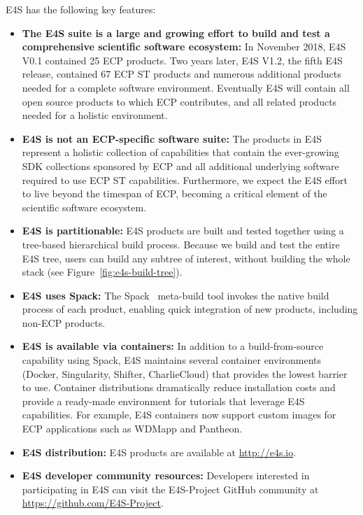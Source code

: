 E4S has the following key features:
\begin{itemize}
	\item \textbf{The E4S suite is a large and growing effort to build and test a comprehensive scientific software ecosystem:} In November 2018, E4S V0.1 contained 25 ECP products.  Two years later, E4S V1.2, the fifth E4S release, contained 67 ECP ST products and numerous additional products needed for a complete software environment.  Eventually E4S will contain all open source products to which ECP contributes, and all related products needed for a holistic environment.
	\item \textbf{E4S is not an ECP-specific software suite:}  The products in E4S represent a holistic collection of capabilities that contain the ever-growing SDK collections sponsored by ECP and all additional underlying software required to use ECP ST capabilities.  Furthermore, we expect the E4S effort to live beyond the timespan of ECP, becoming a critical element of the scientific software ecosystem.
	\item \textbf{E4S is partitionable:} E4S products are built and tested together using a tree-based hierarchical build process.  Because we build and test the entire E4S tree, users can build any subtree of interest, without building the whole stack (see Figure~\ref{fig:e4s-build-tree}).
	\item \textbf{E4S uses Spack:} The Spack~\cite{gamblin+:ecp18-spack-tutorial} meta-build tool invokes the native build process of each product, enabling quick integration of new products, including non-ECP products.
	\item \textbf{E4S is available via containers:} In addition to a build-from-source capability using Spack, E4S maintains several container environments (Docker, Singularity, Shifter, CharlieCloud) that provides the lowest barrier to use.  Container distributions dramatically reduce installation costs and provide a ready-made environment for tutorials that leverage E4S capabilities.  For example, E4S containers now support custom images for ECP applications such as WDMapp and Pantheon.
	\item \textbf{E4S distribution:} E4S products are available at \url{http://e4s.io}.
	\item \textbf{E4S developer community resources:} Developers interested in participating in E4S can visit the E4S-Project GitHub community at \url{https://github.com/E4S-Project}.	
\end{itemize}

